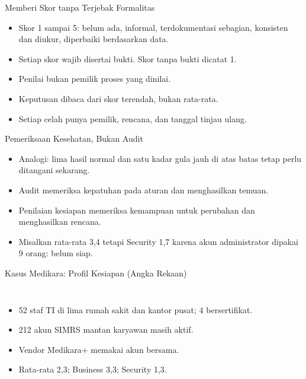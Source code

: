 \documentclass[aspectratio=169, table, 12pt]{beamer}
\begin{document}
\begin{frame}{Memberi Skor tanpa Terjebak Formalitas}
  \begin{itemize}
    \item Skor 1 sampai 5: belum ada, informal, terdokumentasi sebagian, konsisten dan
          diukur, diperbaiki berdasarkan data.
    \item Setiap skor wajib disertai bukti. Skor tanpa bukti dicatat 1.
    \item Penilai bukan pemilik proses yang dinilai.
    \item Keputusan dibaca dari skor terendah, bukan rata-rata.
    \item Setiap celah punya pemilik, rencana, dan tanggal tinjau ulang.
  \end{itemize}
\end{frame}

\begin{frame}{Pemeriksaan Kesehatan, Bukan Audit}
  \begin{itemize}
    \item Analogi: lima hasil normal dan satu kadar gula jauh di atas batas tetap perlu
          ditangani sekarang.
    \item Audit memeriksa kepatuhan pada aturan dan menghasilkan temuan.
    \item Penilaian kesiapan memeriksa kemampuan untuk perubahan dan menghasilkan
          rencana.
    \item Misalkan rata-rata 3,4 tetapi Security 1,7 karena akun administrator dipakai 9
          orang: belum siap.
  \end{itemize}
\end{frame}

\begin{frame}{Kasus Medikara: Profil Kesiapan (Angka Rekaan)}
  \begin{columns}[c]
    \centering
    \resizebox{!}{0.62\textheight}{}

    \footnotesize
    \begin{itemize}
      \item 52 staf TI di lima rumah sakit dan kantor pusat; 4 bersertifikat.
      \item 212 akun SIMRS mantan karyawan masih aktif.
      \item Vendor Medikara+ memakai akun bersama.
      \item Rata-rata 2,3; Business 3,3; Security 1,3.
    \end{itemize}
  \end{columns}
\end{frame}
\end{document}
